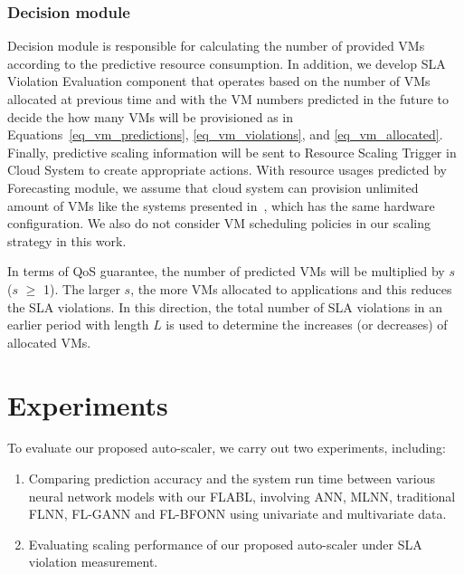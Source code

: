 \documentclass[runningheads]{llncs}
\begin{document}
\subsubsection{Decision module}
\label{decision_module}
Decision module is responsible for calculating the number of provided VMs according to the predictive resource consumption. In addition, we develop SLA Violation Evaluation component that operates based on the number of VMs allocated at previous time and with the VM numbers predicted in the future to decide the how many VMs will be provisioned as in Equations~\ref{eq_vm_predictions}, \ref{eq_vm_violations}, and \ref{eq_vm_allocated}. 
Finally, predictive scaling information will be sent to Resource Scaling Trigger in Cloud System to create appropriate actions.
With resource usages predicted by Forecasting module, we assume that cloud system can provision unlimited amount of VMs like the systems presented in~\cite{ref_nguyen}, which has the same hardware configuration. We also do not consider VM scheduling policies in our scaling strategy in this work. 


In terms of QoS guarantee, the number of predicted VMs will be multiplied by $s$ ($s$ $\ge$ 1). The larger $s$, the more VMs allocated to applications and this reduces the SLA violations. In this direction, the total number of SLA violations in an earlier period with length $L$ is used to determine the increases (or decreases) of allocated VMs. 



\section{Experiments}
\label{experiments}
To evaluate our proposed auto-scaler, we carry out two experiments, including:

\begin{enumerate}
	\item Comparing prediction accuracy and the system run time between various neural network models with our FLABL, involving ANN, MLNN, traditional FLNN, FL-GANN and FL-BFONN using univariate and multivariate data. 
	\item Evaluating scaling performance of our proposed auto-scaler under SLA violation measurement.
\end{enumerate}
\end{document}
